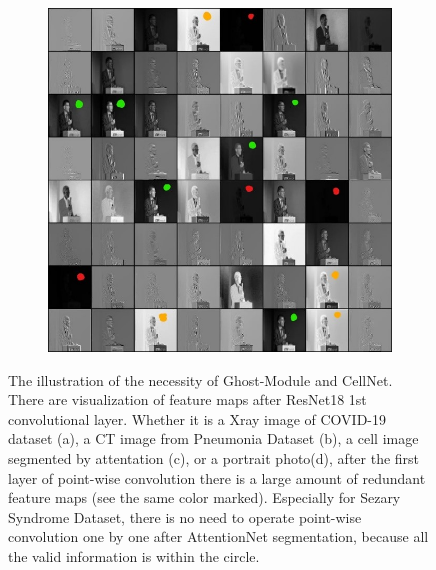 \begin{figure}[t]
\begin{center}
\begin{subfigure}[b]{0.33\textwidth}
			\caption{}
			\label{fig:cellnet}
		\end{subfigure}
        \begin{subfigure}[b]{0.33\textwidth}
			\includegraphics[height= 0.20\textheight]{thesis-template-master/images/cellnetnecc2.jpg}
			\caption{}
			\label{fig:cellnet}
		\end{subfigure}
        
		
	\end{center}
	\caption{The illustration of the necessity of Ghost-Module and CellNet. There are visualization of feature maps after ResNet18\cite{20} 1st convolutional layer. Whether it is a Xray image of COVID-19 dataset (a), a CT image from Pneumonia Dataset (b), a cell image segmented by attentation (c), or  a portrait photo(d), after the first layer of point-wise convolution there is a large amount of redundant feature maps (see the same color marked). Especially for Sezary Syndrome Dataset, there is no need to operate point-wise convolution one by one after AttentionNet segmentation, because all the valid information is within the circle.}
\end{figure}


